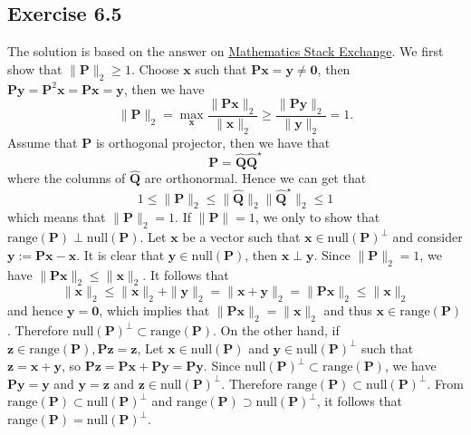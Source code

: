 \documentclass{article}
\begin{document}
\subsection{Exercise 6.5}
The solution is based on the answer on \href{https://math.stackexchange.com/questions/1109755/a-projection-p-is-orthogonal-if-and-only-if-its-spectral-norm-is-1}{Mathematics Stack Exchange}. We first show that $\| \bm{P} \|_2 \geq 1$. Choose $\bm{x}$ such that $ \bm{Px} = \bm{y} \neq \bm{0}$, then $ \bm{P} \bm{y} = \bm{P}^2 \bm{x} = \bm{P} \bm{x} = \bm{y}$, then we have
$$
\| \bm{P} \|_2 = \max_{\bm{x} }  \frac{\| \bm{P x} \|_2}{ \| \bm{x} \|_2 } \geq \frac{\| \bm{P y} \|_2}{ \| \bm{y} \|_2 } = 1.
$$
Assume that $\bm{P} $ is orthogonal projector, then we have that
$$
\bm {P}  = \hat{\bm{Q}} \hat{\bm{Q}}^{\star}
$$
where the columns of $\hat{\bm{Q}}$ are orthonormal. Hence we can get that
$$
1\leq \| \bm{P} \|_2 \leq \|\hat{\bm{Q}} \|_2 \| \hat{\bm{Q}}^{\star}\|_2 \leq 1
$$
which means that $\| \bm{P} \|_2 = 1$. If $\| \bm{P} \| = 1$, we only to show that $\mathrm{range}(\bm{P})  \perp \mathrm{null} (\bm{P})$. Let $\bm{x}$ be a vector such that $\bm{x} \in \mathrm{null} (\bm{P})^{\perp} $ and consider $ \bm{y} := \bm{Px} - \bm{x} $. It is clear that $\bm{y} \in \mathrm{null} (\bm{P}) $, then $\bm{x} \perp \bm{y} $. Since $\| \bm{P}\|_2 = 1$, we have $\| \bm{Px}\|_2 \leq \| \bm{x} \|_2 $. It follows that
$$
 \| \bm{x} \|_2 \leq \| \bm{x} \|_2 + \|\bm{y} \|_2 = \| \bm{x} + \bm{y} \|_2 = \| \bm{Px}\|_2 \leq \| \bm{x} \|_2
$$
and hence $\bm{y} = \bm{0}$, which implies that $\| \bm{Px} \|_2 = \| \bm{x} \|_2$ and thus $\bm{x} \in \mathrm{range} (\bm{P}) $. Therefore $\mathrm{null} (\bm{P})^{\perp} \subset \mathrm{range} (\bm{P}) $. On the other hand, if $\bm{z} \in \mathrm{range} (\bm{P}), \bm{Pz} = \bm{z} $, Let $\bm{x} \in \mathrm{null} (\bm{P}) $ and $\bm{y} \in  \mathrm{null} (\bm{P})^\perp$ such that $\bm{z} = \bm{x} + \bm{y}$, so $\bm{Pz} = \bm{Px} + \bm{Py}  = \bm{Py}$. Since $\mathrm{null} (\bm{P})^\perp \subset \mathrm{range} (\bm{P}) $, we have $\bm{Py} = \bm{y} $ and $\bm{y} = \bm{z} $ and $\bm{z} \in \mathrm{null} (\bm{P})^\perp $. Therefore $\mathrm{range} (\bm{P}) \subset \mathrm{null} (\bm{P})^\perp$. From $\mathrm{range} (\bm{P}) \subset \mathrm{null} (\bm{P})^\perp $ and $\mathrm{range} (\bm{P}) \supset \mathrm{null} (\bm{P})^\perp$, it follows that $\mathrm{range} (\bm{P}) = \mathrm{null} (\bm{P})^\perp$.
\end{document}
